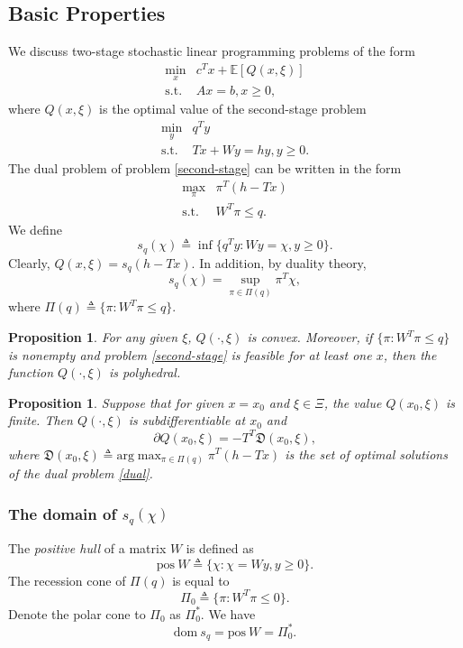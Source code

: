 \documentclass[a4pper,11pt]{article}
\newtheorem{prop}[thm]{Proposition}
\begin{document}
\subsection{Basic Properties}
We discuss two-stage stochastic linear programming problems of the form
\begin{equation}
    \label{first}
    \begin{array}{ll}
        \min_{x}    & c^Tx+\mathbb E[Q(x,\xi)] \\
        \text{s.t.} & Ax=b, x\geq 0,
    \end{array}
\end{equation}
where $Q(x,\xi)$ is the optimal value of the second-stage problem
\begin{equation}
    \begin{array}{ll}
        \min_y      & q^Ty               \\
        \text{s.t.} & Tx+Wy=hy, y\geq 0.
        \label{second-stage}
    \end{array}
\end{equation}
The dual problem of problem \eqref{second-stage} can be written in the form
\begin{equation}
    \begin{array}{ll}
        \max_\pi    & \pi^T(h-Tx)    \\
        \text{s.t.} & W^T\pi \leq q.
        \label{dual}
    \end{array}
\end{equation}
We define
$$
    s_q(\chi)\triangleq \inf\{q^Ty: Wy=\chi,y\geq 0\}.
$$
Clearly, $Q(x,\xi)=s_q(h-Tx)$. In addition, by duality theory,
$$
    s_q(\chi)=\sup_{\pi\in \Pi(q)}\pi^T\chi,
$$
where $\Pi(q)\triangleq\{\pi:W^T\pi\leq q\}$.
\begin{prop} For any given $\xi$, $Q(\cdot,\xi)$ is convex. Moreover, if $\{\pi:W^T\pi\leq q\}$ is nonempty and problem \eqref{second-stage} is feasible for at least one $x$, then the function $Q(\cdot,\xi)$ is polyhedral.
    \label{prop-1}
\end{prop}
\begin{prop}
    Suppose that for given $x=x_0$ and $\xi\in \Xi$, the value $Q(x_0,\xi)$ is finite. Then $Q(\cdot,\xi)$ is subdifferentiable at $x_0$ and
    $$
        \partial Q(x_0,\xi)=-T^T\mathfrak D(x_0,\xi),
    $$
    where $\mathfrak D(x_0,\xi)\triangleq \text{arg}\max_{\pi\in \Pi(q)}\pi^T(h-Tx)$ is the set of optimal solutions of the dual problem \eqref{dual}.
\end{prop}
\subsubsection{The domain of $s_q(\chi)$}
The \textit {positive hull} of a matrix $W$ is defined as
$$\text{pos} \ W\triangleq \{\chi:\chi=Wy, y\geq0\}.$$
The recession cone of $\Pi(q)$ is equal to
$$\Pi_0\triangleq \{\pi:W^T\pi\leq 0\}.$$
Denote the polar cone to $\Pi_0$ as $\Pi_0^*$.
We have
$$\text{dom} \ s_q=\text{pos}\ W=\Pi_0^*.$$
\end{document}

